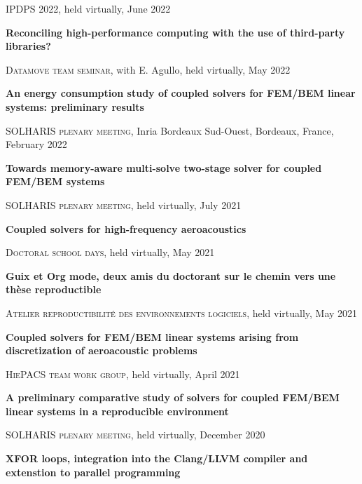\documentclass[a4paper, 11pt]{article}
\begin{document}
\textsc{IPDPS 2022}, held virtually, June 2022

\vspace{.7em}

\textbf{Reconciling high-performance computing with the use of third-party
libraries?}

\textsc{Datamove team seminar}, with E. Agullo, held virtually, May 2022

\vspace{.7em}

\textbf{An energy consumption study of coupled solvers for FEM/BEM linear
systems: preliminary results}

\textsc{SOLHARIS plenary meeting}, Inria Bordeaux Sud-Ouest, Bordeaux, France,
February 2022

\vspace{.7em}

\textbf{Towards memory-aware multi-solve two-stage solver for coupled FEM/BEM
systems}

\textsc{SOLHARIS plenary meeting}, held virtually, July 2021

\vspace{.7em}

\textbf{Coupled solvers for high-frequency aeroacoustics}

\textsc{Doctoral school days}, held virtually, May 2021

\vspace{.7em}

\textbf{Guix et Org mode, deux amis du doctorant sur le chemin vers une thèse
reproductible}

\textsc{Atelier reproductibilité des environnements logiciels}, held virtually,
May 2021

\vspace{.7em}

\textbf{Coupled solvers for FEM/BEM linear systems arising from discretization
of aeroacoustic problems}

\textsc{HiePACS team work group}, held virtually, April 2021

\vspace{.7em}

\textbf{A preliminary comparative study of solvers for coupled FEM/BEM linear
systems in a reproducible environment}

\textsc{SOLHARIS plenary meeting}, held virtually, December 2020

\vspace{.7em}

\textbf{XFOR loops, integration into the Clang/LLVM compiler and extenstion to
parallel programming}
\end{document}
